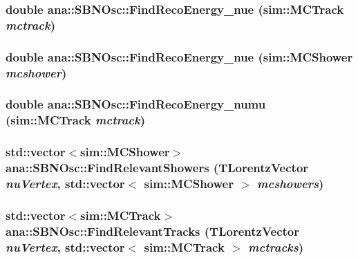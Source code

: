 \label{namespaceana_1_1SBNOsc_a3bcacb7d02055361a967634a2d0a4241}
\hypertarget{namespaceana_1_1SBNOsc_ab46ae3a2aa11ce84c3ee5c6a03eccf27}{
\subsubsection[{FindRecoEnergy\_\-nue}]{\setlength{\rightskip}{0pt plus 5cm}double ana::SBNOsc::FindRecoEnergy\_\-nue (sim::MCTrack {\em mctrack})}}
\label{namespaceana_1_1SBNOsc_ab46ae3a2aa11ce84c3ee5c6a03eccf27}
\hypertarget{namespaceana_1_1SBNOsc_abec8e35567f2cdc64d5dcff2ecdb84c7}{
\subsubsection[{FindRecoEnergy\_\-nue}]{\setlength{\rightskip}{0pt plus 5cm}double ana::SBNOsc::FindRecoEnergy\_\-nue (sim::MCShower {\em mcshower})}}
\label{namespaceana_1_1SBNOsc_abec8e35567f2cdc64d5dcff2ecdb84c7}
\hypertarget{namespaceana_1_1SBNOsc_a3f759be55b0fe7e802a69f9282dccdb5}{
\subsubsection[{FindRecoEnergy\_\-numu}]{\setlength{\rightskip}{0pt plus 5cm}double ana::SBNOsc::FindRecoEnergy\_\-numu (sim::MCTrack {\em mctrack})}}
\label{namespaceana_1_1SBNOsc_a3f759be55b0fe7e802a69f9282dccdb5}
\hypertarget{namespaceana_1_1SBNOsc_a89dd300b266b27181c851bdbbeb1c02f}{
\subsubsection[{FindRelevantShowers}]{\setlength{\rightskip}{0pt plus 5cm}std::vector$<$sim::MCShower$>$ ana::SBNOsc::FindRelevantShowers (TLorentzVector {\em nuVertex}, \/  std::vector$<$ sim::MCShower $>$ {\em mcshowers})}}
\label{namespaceana_1_1SBNOsc_a89dd300b266b27181c851bdbbeb1c02f}
\hypertarget{namespaceana_1_1SBNOsc_a06684ac90b7f2450f87b5cebe46e63d3}{
\subsubsection[{FindRelevantTracks}]{\setlength{\rightskip}{0pt plus 5cm}std::vector$<$sim::MCTrack$>$ ana::SBNOsc::FindRelevantTracks (TLorentzVector {\em nuVertex}, \/  std::vector$<$ sim::MCTrack $>$ {\em mctracks})}}
